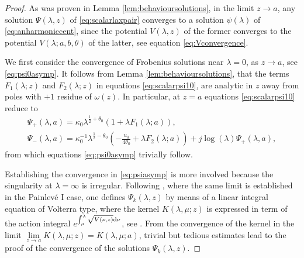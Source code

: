 \documentclass[pdftex]{sigma}
\numberwithin{equation}{section}
\newcommand{\om}{\omega}
\newcommand{\la}{\lambda}
\begin{document}
\begin{proof}
As was proven in Lemma \ref{lem:behavioursolutions}, in the limit $z \to a$, any solution $\Psi(\la,z)$ of \eqref{eq:scalarlaxpair}
converges to a solution $\psi(\la)$ of \eqref{eq:anharmoniccent}, since the potential $V(\la,z)$ of the former converges to the potential $V(\la;a,b,\theta)$
of the latter, see equation \eqref{eq:Vconvergence}.

We f\/irst consider the convergence of Frobenius solutions near $\lambda=0$, as $z\rightarrow a$, see \eqref{eq:psi0asymp}. It follows from Lemma \ref{lem:behavioursolutions}, that the terms $F_1(\lambda;z)$ and $F_2(\lambda;z)$ in equations \eqref{eq:scalarpsi10}, are analytic in $z$ away from poles with $+1$ residue of $\om(z)$. In particular, at $z=a$ equations \eqref{eq:scalarpsi10} reduce to
	\begin{gather*}
	\Psi_+(\lambda,a)=\kappa_0\lambda^{\tfrac{1}{2}+\theta_0}(1+\lambda F_1(\lambda;a)),\\
	\Psi_-(\lambda,a)=\kappa_0^{-1}\lambda^{\tfrac{1}{2}-\theta_0}\left(-\frac{u_0}{4\theta_0}+\lambda F_2(\lambda;a)\right)+j\log(\lambda)\Psi_+(\lambda,a),
	\end{gather*}
from which equations \eqref{eq:psi0asymp} trivially follow.

Establishing the convergence in \eqref{eq:psiasymp} is more involved because the singularity at $\lambda=\infty$ is irregular.
Following \cite[Theorem~4.5]{myphd}, where the same limit is established in the Painlev\'e I case, one def\/ines $\Psi_k(\la,z)$
by means of a linear integral equation of Volterra type, where the kernel $K(\la,\mu;z)$ is expressed in term of the
action integral $e^{\int^\la_\mu \sqrt{V(\nu,z)}{\rm d}\nu}$, see \cite[equation~(4.17)]{myphd}.
From the convergence of the kernel in the limit $\lim\limits_{z \to a}K(\la,\mu;z)=K(\la,\mu;a)$, trivial but tedious estimates
lead to the proof of the convergence of the solutions $\Psi_k(\la,z)$.
\end{proof}
\end{document}
